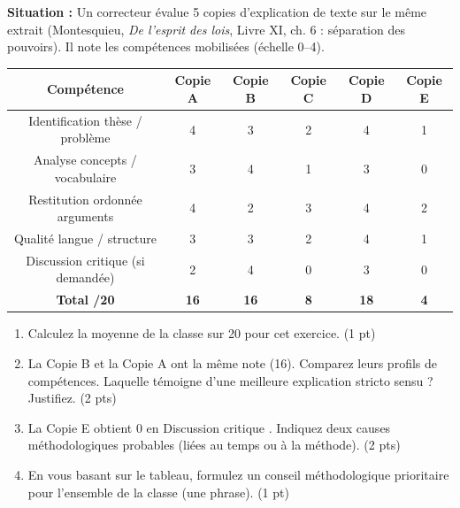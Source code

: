 \documentclass[11pt]{article}
\begin{document}
\begin{exercice}
\textbf{Situation :} Un correcteur évalue 5 copies d'explication de texte sur le même extrait (Montesquieu, \textit{De l'esprit des lois}, Livre XI, ch. 6 : séparation des pouvoirs). Il note les compétences mobilisées (échelle 0--4).

\begin{center}
\begin{tabular}{|c|c|c|c|c|c|}
\hline
\textbf{Compétence} & \textbf{Copie A} & \textbf{Copie B} & \textbf{Copie C} & \textbf{Copie D} & \textbf{Copie E} \\
\hline
Identification thèse / problème & 4 & 3 & 2 & 4 & 1 \\
\hline
Analyse concepts / vocabulaire & 3 & 4 & 1 & 3 & 0 \\
\hline
Restitution ordonnée arguments & 4 & 2 & 3 & 4 & 2 \\
\hline
Qualité langue / structure & 3 & 3 & 2 & 4 & 1 \\
\hline
Discussion critique (si demandée) & 2 & 4 & 0 & 3 & 0 \\
\hline
\textbf{Total /20} & \textbf{16} & \textbf{16} & \textbf{8} & \textbf{18} & \textbf{4} \\
\hline
\end{tabular}
\end{center}

\begin{enumerate}
    \item Calculez la moyenne de la classe sur 20 pour cet exercice. (1 pt)
    \item La Copie B et la Copie A ont la même note (16). Comparez leurs profils de compétences. Laquelle témoigne d'une meilleure \og explication \fg stricto sensu ? Justifiez. (2 pts)
    \item La Copie E obtient 0 en \og Discussion critique \fg. Indiquez deux causes méthodologiques probables (liées au temps ou à la méthode). (2 pts)
    \item En vous basant sur le tableau, formulez un conseil méthodologique prioritaire pour l'ensemble de la classe (une phrase). (1 pt)
\end{enumerate}
\end{exercice}
\end{document}
